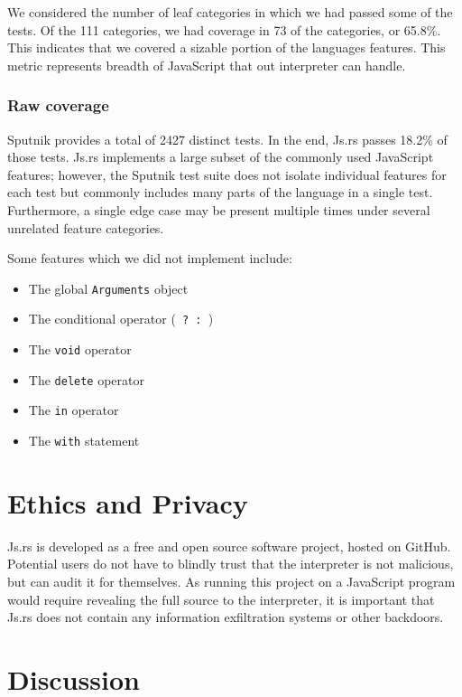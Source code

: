 \documentclass{article}
\begin{document}
\begin{multicols}{2}
We considered the number of leaf categories in which we had passed some of the
tests. Of the 111 categories, we had coverage in 73 of the categories, or
65.8\%. This indicates that we covered a sizable portion of the languages
features. This metric represents breadth of JavaScript that out interpreter can
handle.

\subsubsection*{Raw coverage}

Sputnik provides a total of 2427 distinct tests. In the end, Js.rs passes 18.2\%
of those tests. Js.rs implements a large subset of the commonly used
JavaScript features; however, the Sputnik test suite does not isolate individual
features for each test but commonly includes many parts of the language in a
single test. Furthermore, a single edge case may be present multiple times under
several unrelated feature categories.\newline

Some features which we did not implement include:

\begin{itemize}
  \item The global \texttt{Arguments} object
  \item The conditional operator (\texttt{ ? : })
  \item The \texttt{void} operator
  \item The \texttt{delete} operator
  \item The \texttt{in} operator
  \item The \texttt{with} statement
\end{itemize}

\section{Ethics and Privacy}

Js.rs is developed as a free and open source software project, hosted on GitHub.
Potential users do not have to blindly trust that the interpreter is not
malicious, but can audit it for themselves. As running this project on a
JavaScript program would require revealing the full source to the interpreter,
it is important that Js.rs does not contain any information exfiltration systems
or other backdoors.

\section{Discussion}


\end{multicols}
\end{document}
